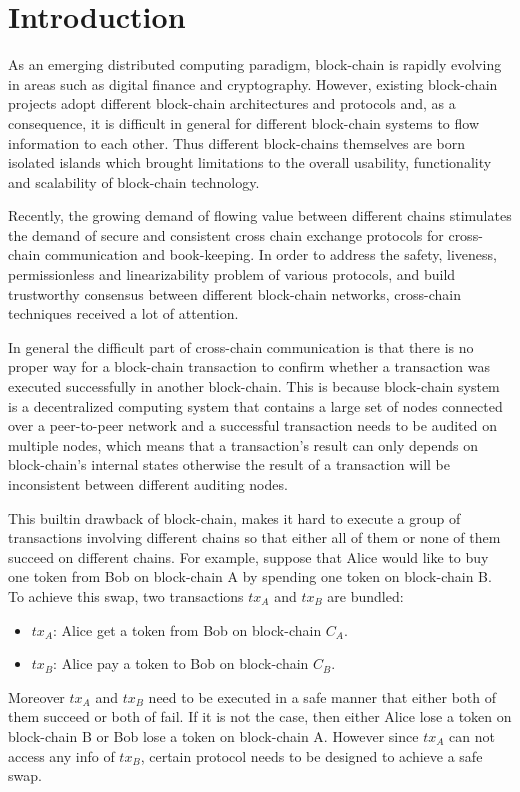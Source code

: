\documentclass[acmtog, natbib=false]{acmart}
\begin{document}
\section{Introduction}
As an emerging distributed computing paradigm, block-chain is rapidly evolving in areas such as digital finance and cryptography. However, existing block-chain projects adopt different block-chain architectures and protocols and, as a consequence, it is difficult in general for different block-chain systems to flow information to each other. Thus different block-chains themselves are born isolated islands which brought limitations to the overall usability, functionality and scalability of block-chain technology. \cite{anati2013innovative}

Recently, the growing demand of flowing value between different chains stimulates the demand of secure and consistent cross chain exchange protocols for cross-chain communication and book-keeping.  In order to address the safety, liveness, permissionless and linearizability problem of various protocols, and build trustworthy consensus between different block-chain networks, cross-chain techniques received a lot of attention.

In general the difficult part of cross-chain communication is that there is no proper way for a block-chain transaction to confirm whether a transaction was executed successfully in another block-chain. This is because block-chain system is a decentralized computing system that contains a large set of nodes connected over a peer-to-peer network and a successful transaction needs to be audited on multiple nodes, which means that a transaction's result can only depends on block-chain's internal states otherwise the result of a transaction will be inconsistent between different auditing nodes. 

This builtin drawback of block-chain, makes it hard to execute a group of transactions involving different chains so that either all of them or none of them succeed on different chains. For example, suppose that Alice would like to buy one token from Bob on block-chain A by spending one token on block-chain B. To achieve this swap, two transactions $tx_A$ and $tx_B$ are bundled:
\begin{itemize}[leftmargin=*]
\item $tx_A$: Alice get a token from Bob on block-chain $C_A$.
\item $tx_B$: Alice pay a token to Bob on block-chain $C_B$.
\end{itemize}
Moreover $tx_A$ and $tx_B$ need to be executed in a safe manner that either both of them succeed or both of fail. If it is not the case, then either Alice lose a token on block-chain B or Bob lose a token on block-chain A. However since $tx_A$ can not access any info of $tx_B$, certain protocol needs to be designed to achieve a safe swap.
\end{document}
